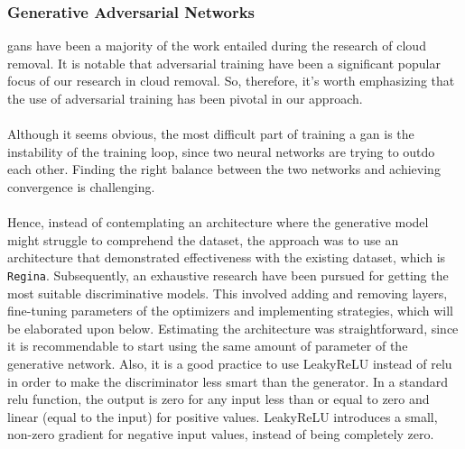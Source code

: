 \subsubsection{Generative Adversarial Networks}
\gls{gan}s have been a majority of the work entailed during the research of cloud removal. It is notable that adversarial training have been a significant popular focus of our research in cloud removal. So, therefore, it's worth emphasizing that the use of adversarial training has been pivotal in our approach.
\\
\\
Although it seems obvious, the most difficult part of training a \gls{gan} is the instability of the training loop, since two neural networks are trying to outdo each other. Finding the right balance between the two networks and achieving convergence is challenging.
\\
\\
Hence, instead of contemplating an architecture where the generative model might struggle to comprehend the dataset, the approach was to use an architecture that demonstrated effectiveness with the existing dataset, which is \texttt{Regina}. Subsequently, an exhaustive research have been pursued for getting the most suitable discriminative models. This involved adding and removing layers, fine-tuning parameters of the optimizers and implementing strategies, which will be elaborated upon below. Estimating the architecture was straightforward, since it is recommendable to start using the same amount of parameter of the generative network. Also, it is a good practice to use LeakyReLU instead of \gls{relu} in order to make the discriminator less smart than the generator. In a standard \gls{relu} function, the output is zero for any input less than or equal to zero and linear (equal to the input) for positive values. LeakyReLU introduces a small, non-zero gradient for negative input values, instead of being completely zero. 

